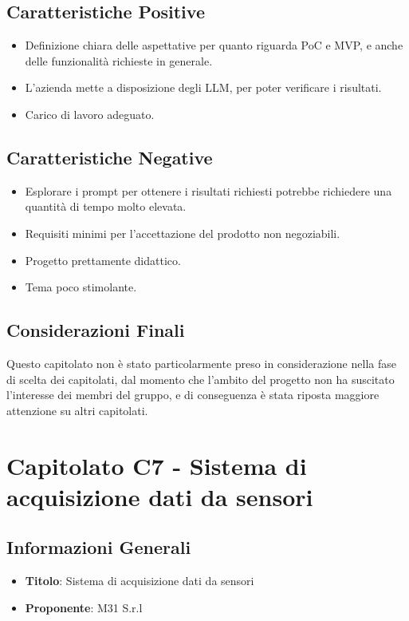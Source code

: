 \documentclass[a4paper,12pt]{article}
\begin{document}
    \subsection{Caratteristiche Positive}
    \begin{itemize}
		\item Definizione chiara delle aspettative per quanto riguarda PoC e MVP, e anche delle funzionalità richieste in generale.
		\item L’azienda mette a disposizione degli LLM, per poter verificare i risultati.
		\item Carico di lavoro adeguato.
    \end{itemize}
    \subsection{Caratteristiche Negative}
    \begin{itemize}
		\item Esplorare i prompt per ottenere i risultati richiesti potrebbe richiedere una quantità di tempo molto elevata.
		\item Requisiti minimi per l’accettazione del prodotto non negoziabili.
		\item Progetto prettamente didattico.
		\item Tema poco stimolante.
    \end{itemize}
    \subsection{Considerazioni Finali}
    Questo capitolato non è stato particolarmente preso in considerazione nella fase di scelta dei capitolati, dal momento che l’ambito del progetto non ha suscitato l’interesse dei membri del gruppo, e di conseguenza è stata riposta maggiore attenzione su altri capitolati.

    \section{Capitolato C7 - Sistema di acquisizione dati da sensori}
    \subsection{Informazioni Generali}
        \begin{itemize}
            \item \textbf{Titolo}: Sistema di acquisizione dati da sensori
            \item \textbf{Proponente}: M31 S.r.l
        \end{itemize}
\end{document}

